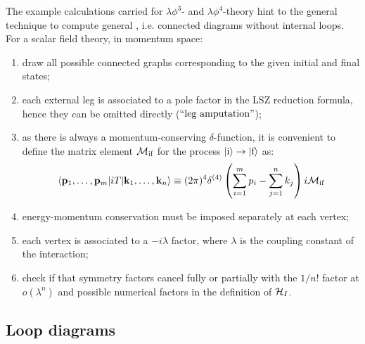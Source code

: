 The example calculations carried for $ \lambda \phi^3 $- and $ \lambda \phi^4 $-theory hint to the general technique to compute general , i.e. connected diagrams without internal loops. For a scalar field theory, in momentum space:
\begin{enumerate}
  \item draw all possible connected graphs corresponding to the given initial and final states;
  \item each external leg is associated to a pole factor in the LSZ reduction formula, hence they can be omitted directly ($ ``\text{leg amputation}" $);
  \item as there is always a momentum-conserving $ \delta $-function, it is convenient to define the matrix element $ \mathcal{M}_\text{if} $ for the process $ \ket{\text{i}} \rightarrow \ket{\text{f}} $ as:
    \begin{equation}
      \braket{\mathbf{p}_1 , \dots , \mathbf{p}_m | i T | \mathbf{k}_1 , \dots , \mathbf{k}_n} \equiv (2\pi)^4 \delta^{(4)}\left( \sum_{i = 1}^{m} p_i - \sum_{j = 1}^{n} k_j \right) i \mathcal{M}_\text{if}
      \label{eq:mat-el}
    \end{equation}
  \item energy-momentum conservation must be imposed separately at each vertex;
  \item each vertex is associated to a $ -i \lambda $ factor, where $ \lambda $ is the coupling constant of the interaction;
  \item check if that symmetry factors cancel fully or partially with the $ 1/n! $ factor at $ o(\lambda^n) $ and possible numerical factors in the definition of $ \mathcal{H}_I $.
\end{enumerate}

\subsection{Loop diagrams}

